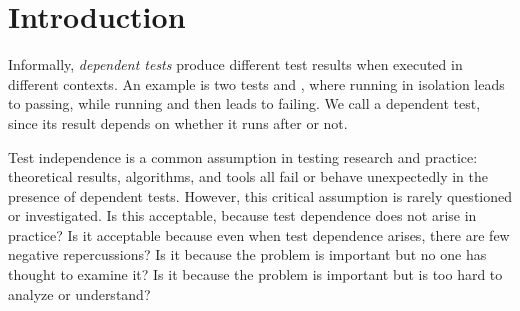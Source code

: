 \section{Introduction}


Informally, \emph{dependent tests} produce different test results when
executed in different contexts. An example is two tests 
and , where running  in isolation leads
to  passing, while running  and then
 leads to  failing. We call 
a dependent test, since its result depends on
whether it runs after  or not.






Test independence is a common assumption in testing research and practice:
theoretical results, algorithms, and tools all fail or behave unexpectedly
in the presence of dependent tests.
However, this critical assumption is rarely questioned or investigated.
Is this acceptable, because test dependence does
not arise in practice?
Is it acceptable because even when test dependence arises, there are few
negative repercussions?
Is it because the problem is important but no one has thought to examine it?
Is it because the problem is important but is too hard to analyze or understand?

